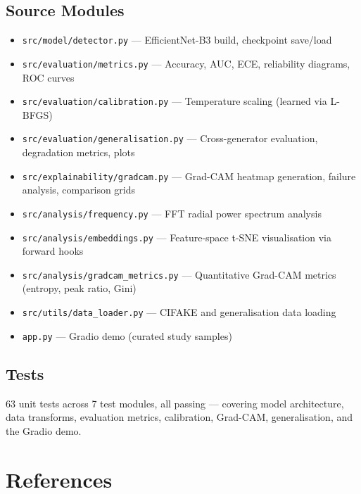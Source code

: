 \documentclass[12pt,a4paper]{article}
\begin{document}
\subsection*{Source Modules}
\begin{itemize}[noitemsep]
    \item \texttt{src/model/detector.py} --- EfficientNet-B3 build, checkpoint save/load
    \item \texttt{src/evaluation/metrics.py} --- Accuracy, AUC, ECE, reliability diagrams, ROC curves
    \item \texttt{src/evaluation/calibration.py} --- Temperature scaling (learned via L-BFGS)
    \item \texttt{src/evaluation/generalisation.py} --- Cross-generator evaluation, degradation metrics, plots
    \item \texttt{src/explainability/gradcam.py} --- Grad-CAM heatmap generation, failure analysis, comparison grids
    \item \texttt{src/analysis/frequency.py} --- FFT radial power spectrum analysis
    \item \texttt{src/analysis/embeddings.py} --- Feature-space t-SNE visualisation via forward hooks
    \item \texttt{src/analysis/gradcam\_metrics.py} --- Quantitative Grad-CAM metrics (entropy, peak ratio, Gini)
    \item \texttt{src/utils/data\_loader.py} --- CIFAKE and generalisation data loading
    \item \texttt{app.py} --- Gradio demo (curated study samples)
\end{itemize}

\subsection*{Tests}
63 unit tests across 7 test modules, all passing --- covering model architecture, data transforms, evaluation metrics, calibration, Grad-CAM, generalisation, and the Gradio demo.

\section*{References}
\end{document}
